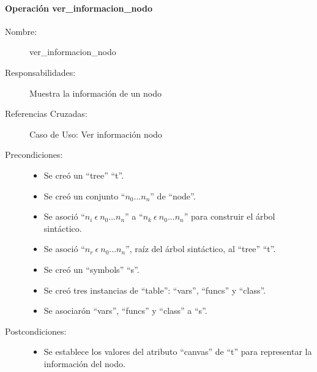 \paragraph{Operación ver\_informacion\_nodo}
\FloatBarrier
\begin{framed}
	\begin{description}
		\item [Nombre:] ver\_informacion\_nodo
		\item [Responsabilidades:] Muestra la información de un nodo
		\item [Referencias Cruzadas: ] Caso de Uso: Ver información nodo
      \item [Precondiciones:] \hfill
         \begin {itemize}
         \item Se creó un ``tree'' ``t''.
         \item Se creó un conjunto ``$n_0...n_n$'' de ``node''.
         \item Se asoció ``$n_i\ \epsilon\ n_0...n_n$'' a ``$n_k\ \epsilon\ n_0...n_n$'' para construir el árbol sintáctico.
         \item Se asoció  ``$n_r\ \epsilon\ n_0...n_n$'', raíz del árbol sintáctico, al ``tree'' ``t''.
         \item Se creó un ``symbols'' ``s''.
         \item Se creó tres instancias de ``table'': ``vars'', ``funcs'' y ``class''.
         \item Se asociarón ``vars'', ``funcs'' y ``class'' a ``s''.
      \end{itemize}
      \item [Postcondiciones:] \hfill
      \begin {itemize}
         \item Se establece los valores del atributo ``canvas'' de ``t'' para representar la información del nodo.
      \end{itemize}
	\end{description} 
\end{framed}
\FloatBarrier

